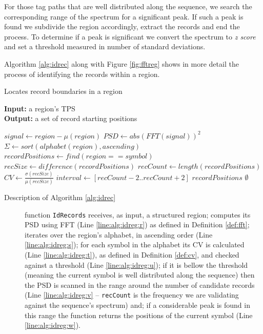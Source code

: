 \documentclass{vldb}
\begin{document}
For those tag paths that are well distributed along the sequence, we search the
corresponding range of the spectrum for a significant peak. If such a peak is
found we subdivide the region accordingly, extract the records and end the
process. To determine if a peak is significant we convert the spectrum to
\textit{z score} and set a threshold measured in number of standard deviations.

Algorithm \ref{alg:idrec} along with Figure \ref{fig:fftreg} shows in more
detail the process of identifying the records within a region.

\begin{algorithm}
\caption{Locates record boundaries in a region}
\label{alg:idrec}
\textbf{Input:} a region's TPS \\
\textbf{Output:} a set of record starting positions

\begin{algorithmic}[1]

\State $signal \leftarrow region-\mu(region)$ 
\State $PSD \leftarrow abs(FFT(signal))^2$\label{line:alg:idreg:r}
\State $\Sigma \leftarrow sort(alphabet(region), ascending)$
\label{line:alg:idreg:s}
\State $recordPositions \leftarrow find(region == symbol)$
\State $recSize \leftarrow difference(recordPositions)$
\State $recCount \leftarrow length(recordPositions)$
\State $CV \leftarrow
\frac{\sigma(recSize)}{\mu(recSize)}$\label{line:alg:idreg:t}
\label{line:alg:idreg:u}
\State $interval \leftarrow [recCount-2 .. recCount+2]$
\label{line:alg:idreg:v}
\State \Return $recordPositions$\label{line:alg:idreg:w}
\EndIf
\EndIf
\EndFor
\State \Return $\emptyset$
\EndFunction

\end{algorithmic}
\end{algorithm}

\begin{description}
\item[Description of Algorithm \ref{alg:idrec}] function \texttt{IdRecords}
receives, as input, a structured region; computes its PSD using FFT (Line
\ref{line:alg:idreg:r}) as defined in Definition \ref{def:fft}; iterates over
the region's alphabet, in ascending order (Line \ref{line:alg:idreg:s}); for
each symbol in the alphabet its CV is calculated (Line \ref{line:alg:idreg:t}),
as defined in Definition \ref{def:cv}, and checked against a threshold (Line
\ref{line:alg:idreg:u}); if it is bellow the threshold (meaning the
current symbol is well distributed along the sequence) then the PSD is scanned
in the range around the number of candidate records (Line \ref{line:alg:idreg:v}
-- \texttt{recCount} is the frequency we are validating against the sequence's
spectrum) and; if a considerable peak is found in this range the function returns the
positions of the current symbol (Line \ref{line:alg:idreg:w}).
\end{description}
\end{document}
